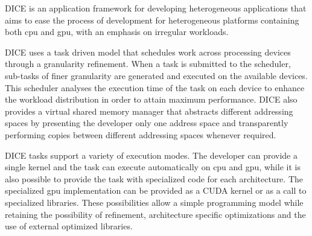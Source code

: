 DICE \citep{Barbosa} is an application framework for developing heterogeneous applications that aims to ease the process of development for heterogeneous platforms containing both \gls{cpu} and \gls{gpu}, with an emphasis on irregular workloads.


DICE uses a task driven model that schedules work across processing devices through a granularity refinement. When a task is submitted to the scheduler, sub-tasks of finer granularity are generated and executed on the available devices. This scheduler analyses the execution time of the task on each device to enhance the workload distribution in order to attain maximum performance. DICE also provides a virtual shared memory manager that abstracts different addressing spaces by presenting the developer only one address space and transparently performing copies between different addressing spaces whenever required.

DICE tasks support a variety of execution modes. The developer can provide a single kernel and the task can execute automatically on \gls{cpu} and \gls{gpu}, while it is also possible to provide the task with specialized code for each architecture. The specialized \gls{gpu} implementation can be provided as a CUDA kernel or as a call to specialized libraries. These possibilities allow a simple programming model while retaining the possibility of refinement, architecture specific optimizations and the use of external optimized libraries.




